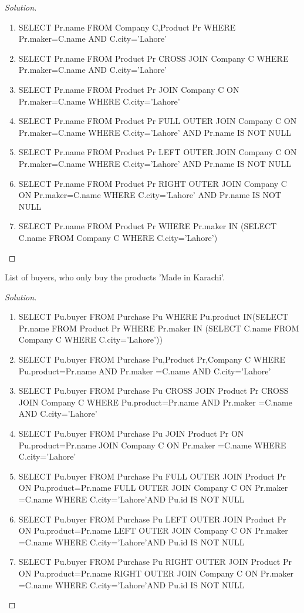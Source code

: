 \documentclass[10pt,a4paper]{article}
\newenvironment{problem}[2][Problem]{\begin{trivlist}
\item[\hskip \labelsep {\bfseries #1}\hskip \labelsep {\bfseries #2.}]}{\end{trivlist}}
\begin{document}
\begin{proof}[Solution]
\begin{enumerate}
	\item SELECT Pr.name FROM Company C,Product Pr WHERE Pr.maker=C.name AND C.city='Lahore' 
	\item  SELECT Pr.name FROM Product Pr CROSS JOIN Company C WHERE Pr.maker=C.name AND C.city='Lahore'
	\item SELECT Pr.name FROM Product Pr JOIN Company C ON Pr.maker=C.name WHERE C.city='Lahore'
	\item SELECT Pr.name FROM Product Pr FULL OUTER JOIN Company C ON Pr.maker=C.name WHERE C.city='Lahore' AND Pr.name IS NOT NULL
	\item SELECT Pr.name FROM Product Pr LEFT OUTER JOIN Company C ON Pr.maker=C.name WHERE C.city='Lahore' AND Pr.name IS NOT NULL
	\item SELECT Pr.name FROM Product Pr RIGHT OUTER JOIN Company C ON Pr.maker=C.name WHERE C.city='Lahore' AND Pr.name IS NOT NULL
	\item SELECT Pr.name FROM Product Pr WHERE Pr.maker IN (SELECT C.name FROM Company C 	WHERE C.city='Lahore')
\end{enumerate}
\end{proof}



\begin{problem}{6}
List of buyers, who only buy the products 'Made in Karachi'.
\end{problem}
\begin{proof}[Solution]
\begin{enumerate}
	\item SELECT Pu.buyer FROM Purchase Pu WHERE Pu.product IN(SELECT Pr.name FROM Product Pr	WHERE Pr.maker IN (SELECT C.name FROM Company C WHERE C.city='Lahore'))
	\item SELECT Pu.buyer FROM Purchase Pu,Product Pr,Company C WHERE Pu.product=Pr.name AND Pr.maker =C.name AND C.city='Lahore'
	\item SELECT Pu.buyer FROM Purchase Pu CROSS JOIN Product Pr CROSS JOIN Company C WHERE Pu.product=Pr.name AND Pr.maker =C.name AND C.city='Lahore'
	\item SELECT Pu.buyer FROM Purchase Pu JOIN Product Pr ON Pu.product=Pr.name JOIN Company C ON Pr.maker =C.name WHERE C.city='Lahore'
	\item  SELECT Pu.buyer FROM Purchase Pu FULL OUTER JOIN Product Pr ON Pu.product=Pr.name FULL OUTER JOIN Company C ON Pr.maker =C.name WHERE C.city='Lahore'AND  Pu.id IS NOT NULL
	\item SELECT Pu.buyer FROM Purchase Pu LEFT OUTER JOIN Product Pr ON Pu.product=Pr.name LEFT OUTER JOIN Company C ON Pr.maker =C.name WHERE C.city='Lahore'AND  Pu.id IS NOT NULL 
	\item SELECT Pu.buyer FROM Purchase Pu RIGHT OUTER JOIN Product Pr ON Pu.product=Pr.name RIGHT OUTER JOIN Company C ON Pr.maker =C.name WHERE C.city='Lahore'AND  Pu.id IS NOT NULL
\end{enumerate}
\end{proof}
\end{document}
